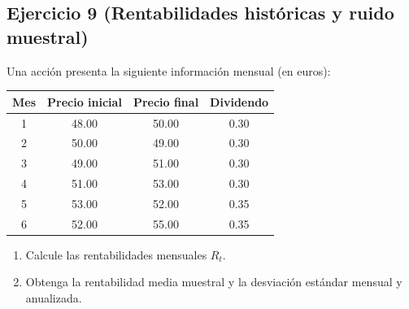 \documentclass[12pt,a4paper]{article}
\newenvironment{ejercicio}[1]{\subsection*{Ejercicio #1}}{}
\begin{document}
\begin{ejercicio}{9 (Rentabilidades históricas y ruido muestral)}
Una acción presenta la siguiente información mensual (en euros):
\begin{center}
\begin{tabular}{c c c c}
\toprule
Mes & Precio inicial & Precio final & Dividendo \\
\midrule
1 & 48.00 & 50.00 & 0.30 \\
2 & 50.00 & 49.00 & 0.30 \\
3 & 49.00 & 51.00 & 0.30 \\
4 & 51.00 & 53.00 & 0.30 \\
5 & 53.00 & 52.00 & 0.35 \\
6 & 52.00 & 55.00 & 0.35 \\
\bottomrule
\end{tabular}
\end{center}
\begin{enumerate}[label=\alph*)]
  \item Calcule las rentabilidades mensuales $R_t$.
  \item Obtenga la rentabilidad media muestral y la desviación estándar mensual y anualizada.
\end{enumerate}
\end{ejercicio}
\end{document}
